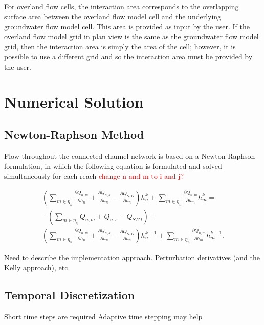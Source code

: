 \documentclass[fleqn]{article}
\begin{document}
For overland flow cells, the interaction area corresponds to the overlapping surface area between the overland flow model cell and the underlying groundwater flow model cell.  This area is provided as input by the user.  If the overland flow model grid in plan view is the same as the groundwater flow model grid, then the interaction area is simply the area of the cell; however, it is possible to use a different grid and so the interaction area must be provided by the user.

\section{Numerical Solution}

\subsection{Newton-Raphson Method}

Flow throughout the connected channel network is based on a Newton-Raphson formulation, in which the following equation is formulated and solved simultaneously for each reach \textcolor{red}{change n and m to i and j?}

\begin{equation}
\label{eqn:nr-cvfd}
\begin{split}
\left ( \sum\limits_{m \in \eta_{n}} \frac{\partial Q_{n,m}}{\partial h_n} + \frac{\partial Q_{n,s}}{\partial h_n} - \frac{\partial Q_{STO}}{\partial h_n} \right ) h^k_n + 
\sum\limits_{m \in \eta_{n}} \frac{\partial Q_{n,m}}{\partial h_m} h^k_{m} = \\
- \left ( \sum\limits_{m \in \eta_{n}} Q_{n,m} + Q_{n,s} - Q_{STO} \right ) + \\
\left ( \sum\limits_{m \in \eta_{n}} \frac{\partial Q_{n,m}}{\partial h_n} + \frac{\partial Q_{n,s}}{\partial h_n} - \frac{\partial Q_{STO}}{\partial h_n} \right ) h^{k-1}_n + \sum\limits_{m \in \eta_{n}} \frac{\partial Q_{n,m}}{\partial h_m} h^{k-1}_{m}.
\end{split}
\end{equation}

Need to describe the implementation approach.  Perturbation derivatives (and the Kelly approach), etc.


\subsection{Temporal Discretization}
Short time steps are required
Adaptive time stepping may help
\end{document}
